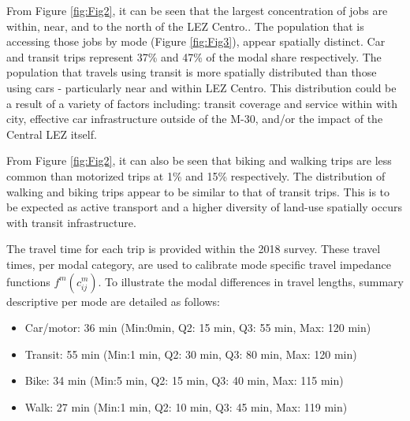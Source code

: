 \documentclass[]{trbunofficial}
\providecommand{\tightlist}{%
  \setlength{\itemsep}{0pt}\setlength{\parskip}{0pt}}
\begin{document}
From Figure \ref{fig:Fig2}, it can be seen that the largest
concentration of jobs are within, near, and to the north of the LEZ
Centro.. The population that is accessing those jobs by mode (Figure
\ref{fig:Fig3}), appear spatially distinct. Car and transit trips
represent 37\% and 47\% of the modal share respectively. The population
that travels using transit is more spatially distributed than those
using cars - particularly near and within LEZ Centro. This distribution
could be a result of a variety of factors including: transit coverage
and service within with city, effective car infrastructure outside of
the M-30, and/or the impact of the Central LEZ itself.

From Figure \ref{fig:Fig2}, it can also be seen that biking and walking
trips are less common than motorized trips at 1\% and 15\% respectively.
The distribution of walking and biking trips appear to be similar to
that of transit trips. This is to be expected as active transport and a
higher diversity of land-use spatially occurs with transit
infrastructure.

The travel time for each trip is provided within the 2018 survey. These
travel times, per modal category, are used to calibrate mode specific
travel impedance functions \(f^m(c_{ij}^m)\). To illustrate the modal
differences in travel lengths, summary descriptive per mode are detailed
as follows:

\begin{itemize}
\tightlist
\item
  Car/motor: 36 min (Min:0min, Q2: 15 min, Q3: 55 min, Max: 120 min)
\item
  Transit: 55 min (Min:1 min, Q2: 30 min, Q3: 80 min, Max: 120 min)
\item
  Bike: 34 min (Min:5 min, Q2: 15 min, Q3: 40 min, Max: 115 min)
\item
  Walk: 27 min (Min:1 min, Q2: 10 min, Q3: 45 min, Max: 119 min)
\end{itemize}
\end{document}
